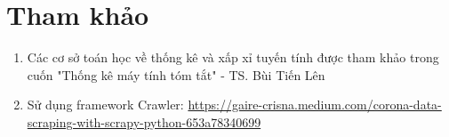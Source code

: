 \documentclass[a4paper, 12pt]{article}
\begin{document}
    \clearpage

    \section{Tham khảo}

    \begin{enumerate}
        \item Các cơ sở toán học về thống kê và xấp xỉ tuyến tính được tham khảo trong cuốn "Thống kê máy tính tóm tắt" - TS. Bùi Tiến Lên
        \item Sử dụng framework Crawler: \url{https://gaire-crisna.medium.com/corona-data-scraping-with-scrapy-python-653a78340699}
    \end{enumerate}

    \clearpage
\end{document}
